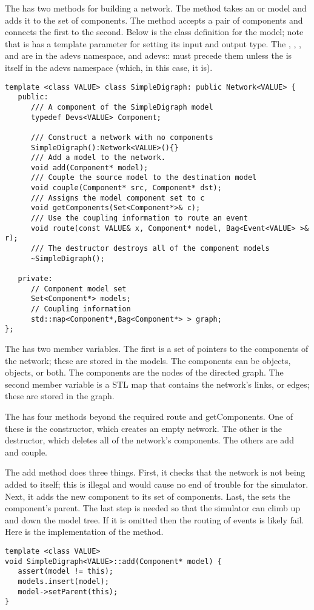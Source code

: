 The  has two methods for building a network. The  method takes an  or  model and adds it to the set of components. The  method accepts a pair of components and connects the first to the second. Below is the class definition for the model; note that is has a template parameter for setting its input and output type. The , , , and  are in the adevs namespace, and \mbox{adevs::} must precede them unless the  is itself in the adevs namespace (which, in this case, it is). 
\begin{verbatim}
template <class VALUE> class SimpleDigraph: public Network<VALUE> { 
   public:
      /// A component of the SimpleDigraph model
      typedef Devs<VALUE> Component;

      /// Construct a network with no components
      SimpleDigraph():Network<VALUE>(){}
      /// Add a model to the network.
      void add(Component* model);
      /// Couple the source model to the destination model  
      void couple(Component* src, Component* dst);
      /// Assigns the model component set to c
      void getComponents(Set<Component*>& c);
      /// Use the coupling information to route an event
      void route(const VALUE& x, Component* model, Bag<Event<VALUE> >& r);
      /// The destructor destroys all of the component models
      ~SimpleDigraph();

   private:   
      // Component model set
      Set<Component*> models;
      // Coupling information
      std::map<Component*,Bag<Component*> > graph;
};
\end{verbatim}
The  has two member variables. The first is a set of pointers to the components of the network; these are stored in the  models. The components can be  objects,  objects, or both. The  components are the nodes of the directed graph. The second member variable is a STL map that contains the network's links, or edges; these are stored in the  graph.

The  has four methods beyond the required route and getComponents. One of these is the constructor, which creates an empty network. The other is the destructor, which deletes all of the network's components. The others are add and couple.

The add method does three things. First, it checks that the network is not being added to itself; this is illegal and would cause no end of trouble for the simulator. Next, it adds the new component to its set of components. Last, the  sets the component's parent. The last step is needed so that the simulator can climb up and down the model tree. If it is omitted then the routing of events is likely fail. Here is the implementation of the  method.
\begin{verbatim}
template <class VALUE> 
void SimpleDigraph<VALUE>::add(Component* model) {
   assert(model != this);
   models.insert(model);
   model->setParent(this);
}
\end{verbatim}

